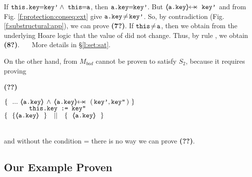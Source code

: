 \begin{example}
 \vspace{.03cm}
\noindent
If  $ \prg{this.key}\!\!=\!\!\prg{key'} \wedge\ \prg{this}\!\!=\!\!\prg{a}$, then $\mbox{\normalfont{\texttt{a.key}}}\!\!=\!\!\mbox{\normalfont{\texttt{key'}}}$. But   $\protectedFrom {\prg{a.key}} {\prg{key'}}$ and   %
 {} from Fig. \ref{f:protection:conseq:ext} give $\mbox{\normalfont{\texttt{a.key}}}\!\neq\!\mbox{\normalfont{\texttt{key'}}}$. So,  by contradiction (\cf Fig. \ref{f:substructural:app}), we can prove    \textbf{(7?)}.
If  $\mbox{\normalfont{\texttt{this}}}\!\neq \!\mbox{\normalfont{\texttt{a}}}$, then we  obtain from the underlying Hoare logic that the value of  did not change. Thus, by rule {}, we obtain  \textbf{(8?)}. \ \ \ More details in \S \ref{l:set:sat}.
 
 \vspace{.045cm}
\noindent
On the other hand,  from $M_{bad}$ cannot be proven to satisfy $S_2$, because it %
requires  proving\\
\vspace{.03cm}
{\small{  \begin{minipage}{.05\textwidth}
   \textbf{(??)}\ \ 
\end{minipage}
\hfill
\begin{minipage}{.95\textwidth}
\begin{flushleft}
$\{ \  \   ...  \  {\inside{\prg{a.key}}} \, \wedge \, \protectedFrom {\prg{a.key}} { (\, \prg{key'},\prg{key''}\, )}  \   \} \ $\\
$\ \ \ \ \ \ \ \ \ \ \  \mbox{\normalfont{\texttt{this.key := key''}}}\   $\\
$  \{\  \    \{ {\inside{\prg{a.key}}}\   \   \}\ \ \  || \ \ \ \{  \ \  {\inside{\prg{a.key}}} \ \  \}  $ 
\end{flushleft}
\end{minipage}
}}
\\
and without the condition = there is no way we can prove \textbf{(??)}.

\subsection{Our Example Proven} %
\label{sect:example:proof:short}

\end{example}

 
